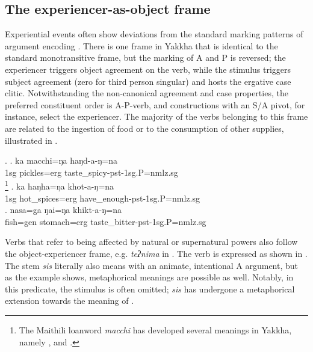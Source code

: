 \subsection{The experiencer-as-object frame}\label{tr-objex}


\noindent
Experiential events often show deviations from the standard marking patterns of argument encoding \citep{Bhaskararao2004_Nonnominative, Malchukov2008Split}. There is one frame in Yakkha that is identical to the standard monotransitive frame, but the marking of A and P is reversed;  the experiencer triggers object agreement on the verb, while the stimulus triggers subject agreement (zero for third person singular) and hosts the ergative case clitic. Notwithstanding the non-canonical agreement and case properties, the preferred constituent order is A-P-verb, and constructions with an S/A pivot, for instance, select the experiencer. The majority of the verbs belonging to this frame are related  to the ingestion of food or to the consumption of other supplies, illustrated in \Next.

\ex. \ag. ka macchi=ŋa haŋd-a-ŋ=na\\
		{\sc 1sg} pickles{\sc =erg} taste\_spicy{\sc -pst-1sg.P=nmlz.sg}\\
		\footnote{The Maithili loanword \emph{macchi} has developed several meanings in Yakkha, namely ,  and .}
	\bg. ka haŋha=ŋa khot-a-ŋ=na\\	
		{\sc 1sg} hot\_spices{\sc =erg} have\_enough{\sc -pst-1sg.P=nmlz.sg}\\
	\bg. nasa=ga ŋai=ŋa khikt-a-ŋ=na\\ 
		fish{\sc =gen} stomach{\sc =erg} taste\_bitter{\sc -pst-1sg.P=nmlz.sg}\\
	
	
Verbs that refer to being affected by natural or supernatural powers also follow the object-experiencer frame, e.g. \emph{teʔnima}  in  \Next.  The verb  is expressed as shown in \Next. The stem \emph{sis} literally also means  with an animate, intentional A argument, but as the example shows, metaphorical meanings are possible as well. Notably, in this predicate, the stimulus is often omitted; \emph{sis} has undergone a metaphorical extension towards the meaning of .

